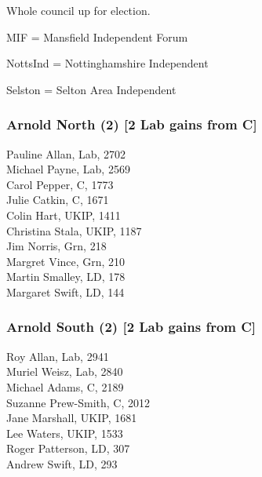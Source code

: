 \documentclass[a4paper,openany,10pt]{book}
\begin{document}
Whole council up for election.

MIF = Mansfield Independent Forum

NottsInd = Nottinghamshire Independent

Selston = Selton Area Independent



\subsubsection*{Arnold North (2) \hspace*{\fill}\nolinebreak[1]%
\enspace\hspace*{\fill}
[2 Lab gains from C]}



Pauline Allan, Lab, 2702\\
Michael Payne, Lab, 2569\\
Carol Pepper, C, 1773\\
Julie Catkin, C, 1671\\
Colin Hart, UKIP, 1411\\
Christina Stala, UKIP, 1187\\
Jim Norris, Grn, 218\\
Margret Vince, Grn, 210\\
Martin Smalley, LD, 178\\
Margaret Swift, LD, 144\\


\subsubsection*{Arnold South (2) \hspace*{\fill}\nolinebreak[1]%
\enspace\hspace*{\fill}
[2 Lab gains from C]}



Roy Allan, Lab, 2941\\
Muriel Weisz, Lab, 2840\\
Michael Adams, C, 2189\\
Suzanne Prew-Smith, C, 2012\\
Jane Marshall, UKIP, 1681\\
Lee Waters, UKIP, 1533\\
Roger Patterson, LD, 307\\
Andrew Swift, LD, 293\\
\end{document}
